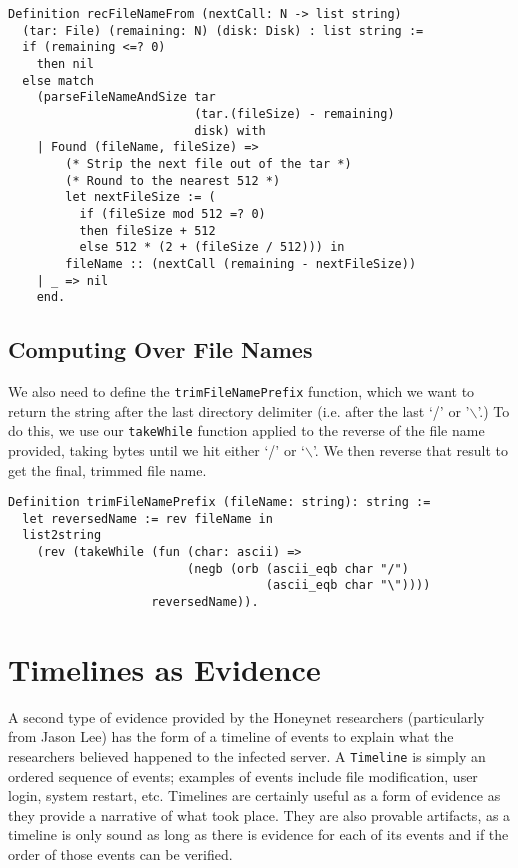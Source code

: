 \documentclass[nocopyrightspace]{sigplanconf}
\begin{document}
\begin{lstlisting}
Definition recFileNameFrom (nextCall: N -> list string) 
  (tar: File) (remaining: N) (disk: Disk) : list string :=
  if (remaining <=? 0)
    then nil
  else match 
    (parseFileNameAndSize tar 
                          (tar.(fileSize) - remaining) 
                          disk) with
    | Found (fileName, fileSize) =>
        (* Strip the next file out of the tar *)
        (* Round to the nearest 512 *)
        let nextFileSize := (
          if (fileSize mod 512 =? 0)
          then fileSize + 512
          else 512 * (2 + (fileSize / 512))) in
        fileName :: (nextCall (remaining - nextFileSize))
    | _ => nil
    end.
\end{lstlisting}

\subsection{Computing Over File Names}

We also need to define the {\tt trimFileNamePrefix} function, which we want to
return the string after the last directory delimiter (i.e. after the last `/'
or '$\backslash$'.) To do this, we use our {\tt takeWhile} function applied
to the reverse of the file name provided, taking bytes until we hit either `/'
or `$\backslash$'. We then reverse that result to get the final, trimmed file
name.

\begin{lstlisting}
Definition trimFileNamePrefix (fileName: string): string :=
  let reversedName := rev fileName in
  list2string
    (rev (takeWhile (fun (char: ascii) => 
                         (negb (orb (ascii_eqb char "/")
                                    (ascii_eqb char "\"))))
                    reversedName)).
\end{lstlisting}

\section{Timelines as Evidence}
\label{sec:timelines}

A second type of evidence provided by the Honeynet researchers (particularly
from Jason Lee\cite{lee}) has the form of a timeline of events to explain what
the researchers believed happened to the infected server. A {\tt Timeline} is
simply an ordered sequence of events; examples of events include file
modification, user login, system restart, etc. Timelines are certainly useful
as a form of evidence as they provide a narrative of what took place. They are
also provable artifacts, as a timeline is only sound as long as there is
evidence for each of its events and if the order of those events can be
verified. 
\end{document}
